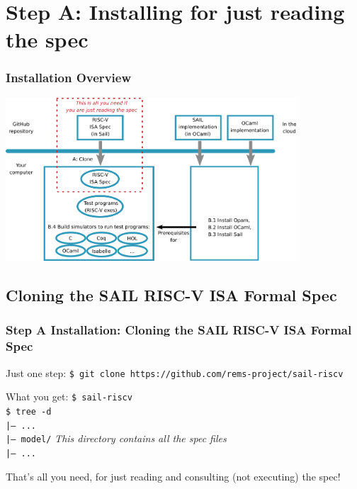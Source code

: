 \documentclass[aspectratio=169]{beamer}
\newcommand{\hm}{\hspace*{1em}}
\newcommand{\scripttt}{\scriptsize\tt}
\begin{document}

\section{Step A: Installing for just reading the spec}

\begin{frame}
  \frametitle{Installation Overview}

  \centering
  \includegraphics[height=2.4in]{Figures/Fig_Installation_Overview.png}
\end{frame}



\subsection{Cloning the SAIL RISC-V ISA Formal Spec}

\begin{frame}
  \frametitle{Step A Installation: Cloning the SAIL RISC-V ISA Formal Spec}

  \begin{block}{Just one step:}
    {\scripttt\hm{}\$ git clone https://github.com/rems-project/sail-riscv}
  \end{block}

  \begin{block}{What you get:}
    {\scripttt\hm{}\$ sail-riscv} \\
    {\scripttt\hm{}\$ tree -d} \\
    {\scripttt\hm{}|-- ...} \\
    {\scripttt\hm{}|-- model/} \hspace{5em} \emph{This directory contains all the spec files}\\
    {\scripttt\hm{}|-- ...} \\
  \end{block}

  That's all you need, for just reading and consulting (not executing) the spec!

\end{frame}
\end{document}
